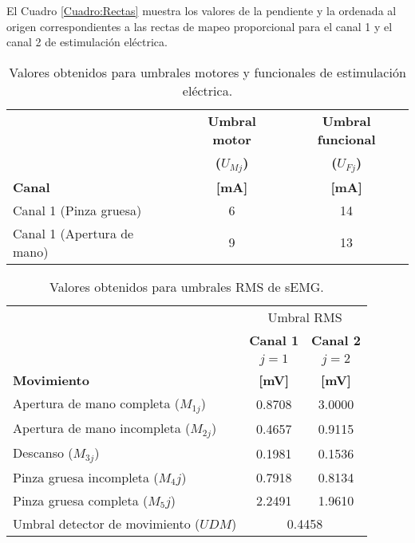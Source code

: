 El Cuadro \ref{Cuadro:Rectas} muestra los valores de la pendiente y la ordenada al origen correspondientes a las rectas de mapeo proporcional para el canal 1 y el canal 2 de estimulación eléctrica.

\begin{table}[htbp]
	\centering
	\begin{tabular}{|l|c|c|}
	\hline
	\textbf{} & \textbf{Umbral motor} & \textbf{Umbral funcional}\\
	\textbf{} & \textbf{($U_{Mj}$)} & \textbf{($U_{Fj}$)}\\
	\textbf{Canal} & \textbf{[mA]} & \textbf{[mA]}\\ \hline	\hline
	Canal 1 (Pinza gruesa) & 6 & 14\\ \hline
	Canal 1 (Apertura de mano) & 9 & 13\\ \hline
	\end{tabular}
	\caption{Valores obtenidos para umbrales motores y funcionales de estimulación eléctrica.}
	\label{Cuadro:UmbralesFES}
\end{table}

\begin{table}[htbp]
	\centering
	\begin{tabular}{|l|c|c|}
	\hline
	\textbf{} & \multicolumn{2}{|c|}{Umbral RMS}\\
	\textbf{} & \textbf{Canal 1} & \textbf{Canal 2}\\
	\textbf{} & \textbf{$j=1$} & \textbf{$j=2$}\\
	\textbf{Movimiento} & \textbf{[mV]} & \textbf{[mV]}\\ \hline \hline
	Apertura de mano completa ($M_{1j}$) & 0.8708 & 3.0000\\ \hline
	Apertura de mano incompleta	($M_{2j}$) & 0.4657 & 0.9115\\ \hline
	Descanso ($M_{3j}$) & 0.1981 & 0.1536\\ \hline
	Pinza gruesa incompleta ($M_4j$) & 0.7918 & 0.8134\\ \hline
	Pinza gruesa completa ($M_5j$) & 2.2491 & 1.9610\\ \hline	
	Umbral detector de movimiento ($UDM$) & \multicolumn{2}{|c|}{0.4458}\\ \hline
	\end{tabular}
	\caption{Valores obtenidos para umbrales RMS de sEMG.}
	\label{Cuadro:UmbralesRMS}
\end{table}

